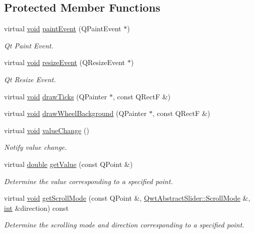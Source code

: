 \subsection*{Protected Member Functions}
\begin{DoxyCompactItemize}
\item 
virtual \hyperlink{group___u_a_v_objects_plugin_ga444cf2ff3f0ecbe028adce838d373f5c}{void} \hyperlink{class_qwt_wheel_a8856da1dadb2a7b73e8bd75a1e981ea3}{paint\-Event} (Q\-Paint\-Event $\ast$)
\begin{DoxyCompactList}\small\item\em Qt Paint Event. \end{DoxyCompactList}\item 
virtual \hyperlink{group___u_a_v_objects_plugin_ga444cf2ff3f0ecbe028adce838d373f5c}{void} \hyperlink{class_qwt_wheel_a533bc57aef5b9fcbdbe4f91c437d1d60}{resize\-Event} (Q\-Resize\-Event $\ast$)
\begin{DoxyCompactList}\small\item\em Qt Resize Event. \end{DoxyCompactList}\item 
virtual \hyperlink{group___u_a_v_objects_plugin_ga444cf2ff3f0ecbe028adce838d373f5c}{void} \hyperlink{class_qwt_wheel_aba74d0e494f6e590ac1deac60a66a68e}{draw\-Ticks} (Q\-Painter $\ast$, const Q\-Rect\-F \&)
\item 
virtual \hyperlink{group___u_a_v_objects_plugin_ga444cf2ff3f0ecbe028adce838d373f5c}{void} \hyperlink{class_qwt_wheel_a2c4fc6e5e04cd5623a035fd9581d395f}{draw\-Wheel\-Background} (Q\-Painter $\ast$, const Q\-Rect\-F \&)
\item 
virtual \hyperlink{group___u_a_v_objects_plugin_ga444cf2ff3f0ecbe028adce838d373f5c}{void} \hyperlink{class_qwt_wheel_a0fa3d4f4189f7bb6ee0944cd30060eb5}{value\-Change} ()
\begin{DoxyCompactList}\small\item\em Notify value change. \end{DoxyCompactList}\item 
virtual \hyperlink{_super_l_u_support_8h_a8956b2b9f49bf918deed98379d159ca7}{double} \hyperlink{class_qwt_wheel_ae356508d15272291857ca9ca6c84134e}{get\-Value} (const Q\-Point \&)
\begin{DoxyCompactList}\small\item\em Determine the value corresponding to a specified point. \end{DoxyCompactList}\item 
virtual \hyperlink{group___u_a_v_objects_plugin_ga444cf2ff3f0ecbe028adce838d373f5c}{void} \hyperlink{class_qwt_wheel_a0fdd78e189618b7c40832e4e52954653}{get\-Scroll\-Mode} (const Q\-Point \&, \hyperlink{class_qwt_abstract_slider_ae4c0c4844ac6a35356f3c529a8eae154}{Qwt\-Abstract\-Slider\-::\-Scroll\-Mode} \&, \hyperlink{ioapi_8h_a787fa3cf048117ba7123753c1e74fcd6}{int} \&direction) const 
\begin{DoxyCompactList}\small\item\em Determine the scrolling mode and direction corresponding to a specified point. \end{DoxyCompactList}\end{DoxyCompactItemize}
